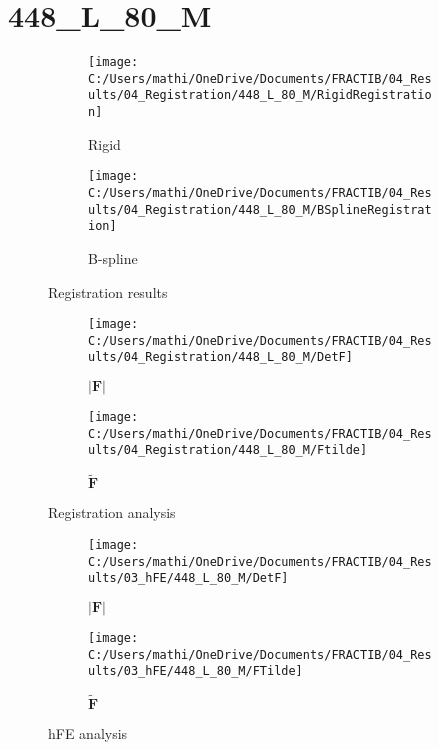\documentclass{article}%
\begin{document}
%
\newpage%
\section*{448\_L\_80\_M}%
\label{sec:448L80M}%


\begin{figure}[h!]%
\begin{subfigure}[b]{0.5\linewidth}%
\texttt{[image: C:/Users/mathi/OneDrive/Documents/FRACTIB/04\_Results/04\_Registration/448\_L\_80\_M/RigidRegistration]}%
\caption{Rigid}%
\end{subfigure}%
\begin{subfigure}[b]{0.5\linewidth}%
\texttt{[image: C:/Users/mathi/OneDrive/Documents/FRACTIB/04\_Results/04\_Registration/448\_L\_80\_M/BSplineRegistration]}%
\caption{B{-}spline}%
\end{subfigure}%
\caption{Registration results}%
\end{figure}

%


\begin{figure}[h!]%
\begin{subfigure}[b]{0.5\linewidth}%
\texttt{[image: C:/Users/mathi/OneDrive/Documents/FRACTIB/04\_Results/04\_Registration/448\_L\_80\_M/DetF]}%
\caption{$|\mathbf{F}|$}%
\end{subfigure}%
\begin{subfigure}[b]{0.5\linewidth}%
\texttt{[image: C:/Users/mathi/OneDrive/Documents/FRACTIB/04\_Results/04\_Registration/448\_L\_80\_M/Ftilde]}%
\caption{$\tilde{\mathbf{F}}$}%
\end{subfigure}%
\caption{Registration analysis}%
\end{figure}

%


\begin{figure}[h!]%
\begin{subfigure}[b]{0.5\linewidth}%
\texttt{[image: C:/Users/mathi/OneDrive/Documents/FRACTIB/04\_Results/03\_hFE/448\_L\_80\_M/DetF]}%
\caption{$|\mathbf{F}|$}%
\end{subfigure}%
\begin{subfigure}[b]{0.5\linewidth}%
\texttt{[image: C:/Users/mathi/OneDrive/Documents/FRACTIB/04\_Results/03\_hFE/448\_L\_80\_M/FTilde]}%
\caption{$\tilde{\mathbf{F}}$}%
\end{subfigure}%
\caption{hFE analysis}%
\end{figure}
\end{document}
